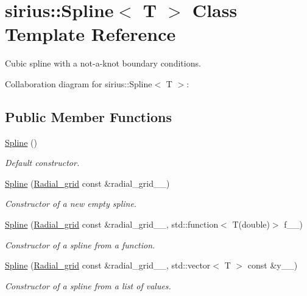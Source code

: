\hypertarget{classsirius_1_1_spline}{}\section{sirius\+:\+:Spline$<$ T $>$ Class Template Reference}
\label{classsirius_1_1_spline}


Cubic spline with a not-\/a-\/knot boundary conditions.  




Collaboration diagram for sirius\+:\+:Spline$<$ T $>$\+:
\subsection*{Public Member Functions}
\begin{DoxyCompactItemize}
\item 
\hyperlink{classsirius_1_1_spline_ad9e03e4372425fcf3d1285e8e89cac53}{Spline} ()
\begin{DoxyCompactList}\small\item\em Default constructor. \end{DoxyCompactList}\item 
\hyperlink{classsirius_1_1_spline_a7102780850d068acbd971db0d17106c8}{Spline} (\hyperlink{classsirius_1_1_radial__grid}{Radial\+\_\+grid} const \&radial\+\_\+grid\+\_\+\+\_\+)
\begin{DoxyCompactList}\small\item\em Constructor of a new empty spline. \end{DoxyCompactList}\item 
\hyperlink{classsirius_1_1_spline_a345756a1c4328cb66609cec2ca542db9}{Spline} (\hyperlink{classsirius_1_1_radial__grid}{Radial\+\_\+grid} const \&radial\+\_\+grid\+\_\+\+\_\+, std\+::function$<$ T(double)$>$ f\+\_\+\+\_\+)
\begin{DoxyCompactList}\small\item\em Constructor of a spline from a function. \end{DoxyCompactList}\item 
\hyperlink{classsirius_1_1_spline_a9946ba895c7c5ea8bcfc4e85abb21237}{Spline} (\hyperlink{classsirius_1_1_radial__grid}{Radial\+\_\+grid} const \&radial\+\_\+grid\+\_\+\+\_\+, std\+::vector$<$ T $>$ const \&y\+\_\+\+\_\+)
\begin{DoxyCompactList}\small\item\em Constructor of a spline from a list of values. \end{DoxyCompactList}\item 

\end{DoxyCompactItemize}
